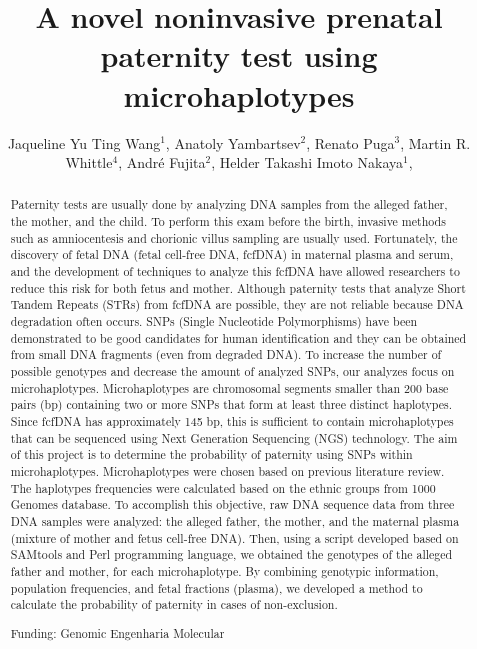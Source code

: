 \documentclass[twoside]{article}
\title{\vspace{-15mm}\fontsize{24pt}{10pt}\selectfont\textbf{ A novel noninvasive prenatal paternity test using microhaplotypes }} %
\author{ Jaqueline Yu Ting Wang$^{1}$, Anatoly Yambartsev$^{2}$, Renato Puga$^{3}$, Martin R. Whittle$^{4}$, André Fujita$^{2}$, Helder Takashi Imoto Nakaya$^{1}$, }
\affil{ 1 University of São Paulo

2 Institute of Mathematics and Statistics - USP

3 Hospital Israelita Albert Einstein

4 Genomic Engenharia Molecular

 }
\date{}
\begin{document}
  
  
  \maketitle %
  
  
  \thispagestyle{fancy} %
  
  
  \begin{abstract}
  Paternity tests are usually done by analyzing DNA samples from the alleged father, the mother, and the child. To perform this exam before the birth, invasive methods such as amniocentesis and chorionic villus sampling are usually used. Fortunately, the discovery of fetal DNA (fetal cell-free DNA, fcfDNA) in maternal plasma and serum, and the development of techniques to analyze this fcfDNA have allowed researchers to reduce this risk for both fetus and mother. Although paternity tests that analyze Short Tandem Repeats (STRs) from fcfDNA are possible, they are not reliable because DNA degradation often occurs. SNPs (Single Nucleotide Polymorphisms) have been demonstrated to be good candidates for human identification and they can be obtained from small DNA fragments (even from degraded DNA). To increase the number of possible genotypes and decrease the amount of analyzed SNPs, our analyzes focus on microhaplotypes. Microhaplotypes are chromosomal segments smaller than 200 base pairs (bp) containing two or more SNPs that form at least three distinct haplotypes. Since fcfDNA has approximately 145 bp, this is sufficient to contain microhaplotypes that can be sequenced using Next Generation Sequencing (NGS) technology. The aim of this project is to determine the probability of paternity using SNPs within microhaplotypes. Microhaplotypes were chosen based on previous literature review. The haplotypes frequencies were calculated based on the ethnic groups from 1000 Genomes database. To accomplish this objective, raw DNA sequence data from three DNA samples were analyzed: the alleged father, the mother, and the maternal plasma (mixture of mother and fetus cell-free DNA). Then, using a script developed based on SAMtools and Perl programming language, we obtained the genotypes of the alleged father and mother, for each microhaplotype. By combining genotypic information, population frequencies, and fetal fractions (plasma), we developed a method to calculate the probability of paternity in cases of non-exclusion.
  
  Funding: Genomic Engenharia Molecular \\ 
  \end{abstract}
  
\end{document}
